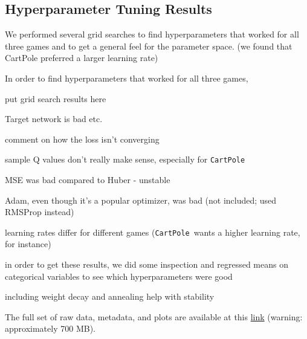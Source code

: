 \documentclass[11pt]{article}
\newcommand{\cp}{\texttt{CartPole}}
\begin{document}




\subsection{Hyperparameter Tuning Results}

We performed several grid searches to find hyperparameters that worked for all three games and to get a general feel for the parameter space. (we found that CartPole preferred a larger learning rate)


In order to find hyperparameters that worked for all three games, 

put grid search results here

Target network is bad etc.

comment on how the loss isn't converging

sample Q values don't really make sense, especially for \cp
 
MSE was bad compared to Huber - unstable

Adam, even though it's a popular optimizer, was bad (not included; used RMSProp instead)

learning rates differ for different games (\cp~wants a higher learning rate, for instance)

in order to get these results, we did some inspection and regressed means on categorical variables to see which hyperparameters were good

including weight decay and annealing help with stability

The full set of raw data, metadata, and plots are available at this \href{https://drive.google.com/drive/folders/15gt9bv0kPBCHnJyW_RzsYQygeMaK1uCf?usp=sharing}{link} (warning: approximately 700 MB).
\end{document}
